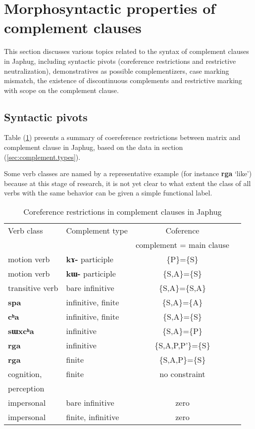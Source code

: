 \documentclass[oneside,a4paper,11pt]{article}
\newcommand{\ipa}[1]{\textbf{\phon#1}} %
\newcommand{\jpg}[2]{\ipa{#1} `#2'} %
\begin{document}
\section{Morphosyntactic properties of complement clauses} 
This section discusses various topics related to the syntax of complement clauses in Japhug, including syntactic pivots (coreference restrictions and restrictive neutralization), demonstratives as possible complementizers, case marking mismatch, the existence of discontinuous complements and restrictive marking with scope on the complement clause.

 \subsection{Syntactic pivots} 
Table (\ref{tab:coref}) presents a summary of coereference restrictions between matrix and complement clause in Japhug, based on the data in section (\ref{sec:complement.types}).

Some verb classes are named by a representative example (for instance \jpg{rga}{like}) because at this stage of research, it is not yet clear to what extent the class of all verbs with the same behavior can be given a simple functional label.

\begin{table}[H]
\caption{Coreference restrictions in complement clauses in Japhug} \label{tab:coref} \centering
\begin{tabular}{llcc}
\toprule
Verb class & 	Complement type & 	Coference & 	\\
&& complement = main clause \\
\midrule
motion verb & 	\ipa{kɤ-} participle & 	\{P\}=\{S\} & 	\\
\midrule
motion verb & 	\ipa{kɯ-} participle & 	\{S,A\}=\{S\} & 	\\
transitive verb & 	bare infinitive & 	\{S,A\}=\{S,A\} & 	\\
\ipa{spa} & 	infinitive, finite & 	\{S,A\}=\{A\} & 	\\
\ipa{cʰa} & 	infinitive, finite & 	\{S,A\}=\{S\} & 	\\
\ipa{sɯxcʰa} & 	infinitive & 	\{S,A\}=\{P\} & 	\\
\midrule
\ipa{rga} & 	infinitive & 	\{S,A,P,P'\}=\{S\} & 	\\
\ipa{rga} & 	finite & 	\{S,A,P\}=\{S\} & 	\\
\midrule
cognition, & finite & no constraint \\
perception \\
impersonal & 	bare infinitive & 	zero & 	\\
impersonal & 	finite, infinitive & 	zero & 	\\
\bottomrule
\end{tabular}
\end{table}
\end{document}
